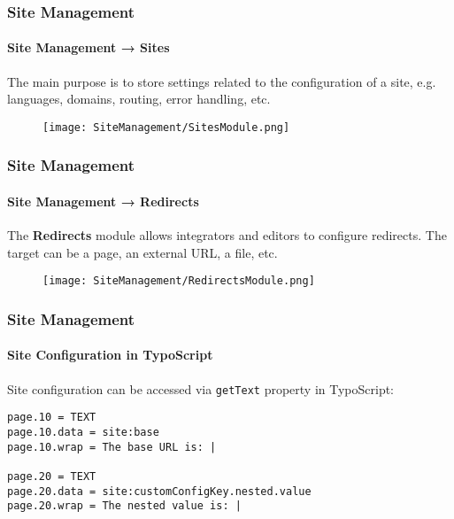 
\begin{frame}[fragile]
	\frametitle{Site Management}
	\framesubtitle{Site Management → Sites}

	The main purpose is to store settings related to the configuration of a
	site, e.g. languages, domains, routing, error handling, etc.

	\begin{figure}
		\texttt{[image: SiteManagement/SitesModule.png]}
	\end{figure}

\end{frame}


\begin{frame}[fragile]
	\frametitle{Site Management}
	\framesubtitle{Site Management → Redirects}

	The \textbf{Redirects} module allows integrators and editors to configure
	redirects. The target can be a page, an external URL, a file, etc.

	\begin{figure}
		\texttt{[image: SiteManagement/RedirectsModule.png]}
	\end{figure}

\end{frame}


\begin{frame}[fragile]
	\frametitle{Site Management}
	\framesubtitle{Site Configuration in TypoScript}

	\lstset{basicstyle=\smaller\ttfamily}

	Site configuration can be accessed via \texttt{getText} property in
	TypoScript:

\begin{lstlisting}
page.10 = TEXT
page.10.data = site:base
page.10.wrap = The base URL is: |

page.20 = TEXT
page.20.data = site:customConfigKey.nested.value
page.20.wrap = The nested value is: |
\end{lstlisting}

\end{frame}

